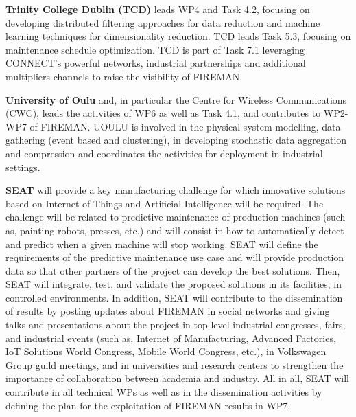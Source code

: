 \textbf{Trinity College Dublin (TCD)} leads WP4 and Task 4.2, focusing on developing distributed filtering approaches for data reduction and machine learning techniques for dimensionality reduction. TCD leads Task 5.3, focusing on maintenance schedule optimization. TCD is part of Task 7.1 leveraging CONNECT’s powerful networks, industrial partnerships and additional multipliers channels to raise the visibility of FIREMAN.

\textbf{University of Oulu} and, in particular the Centre for Wireless Communications (CWC), leads the activities of WP6 as well as Task 4.1, and contributes to WP2-WP7 of FIREMAN. UOULU is involved in the physical system modelling, data gathering (event based and clustering), in developing stochastic data aggregation and compression and coordinates the activities for deployment in industrial settings.

\textbf{SEAT} will provide a key manufacturing challenge for which innovative solutions based on Internet of Things and Artificial Intelligence will be required. The challenge will be related to predictive maintenance of production machines (such as, painting robots, presses, etc.) and will consist in how to automatically detect and predict when a given machine will stop working. SEAT will define the requirements of the predictive maintenance use case and will provide production data so that other partners of the project can develop the best solutions. Then, SEAT will integrate, test, and validate the proposed solutions in its facilities, in controlled environments. In addition, SEAT will contribute to the dissemination of results by posting updates about FIREMAN in social networks and giving talks and presentations about the project in top-level industrial congresses, fairs, and industrial events (such as, Internet of Manufacturing, Advanced Factories, IoT Solutions World Congress, Mobile World Congress, etc.), in Volkswagen Group guild meetings, and in universities and research centers to strengthen the importance of collaboration between academia and industry. All in all, SEAT will contribute in all technical WPs as well as in the dissemination activities by defining the plan for the exploitation of FIREMAN results in WP7.
